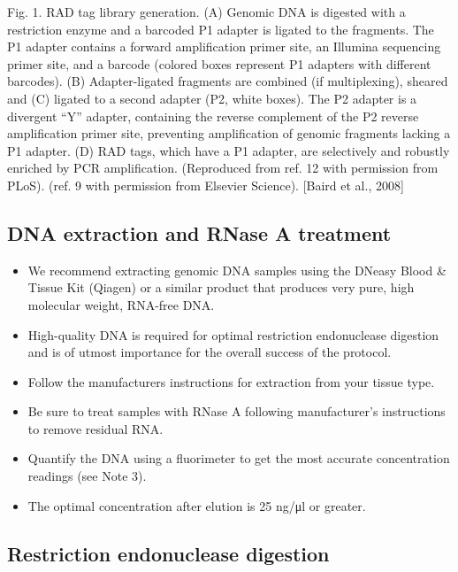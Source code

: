 \documentclass[
  letterpaper,
  DIV=11,
  numbers=noendperiod]{scrreprt}
\providecommand{\tightlist}{%
  \setlength{\itemsep}{0pt}\setlength{\parskip}{0pt}}\usepackage{longtable,booktabs,array}
\begin{document}
Fig. 1. RAD tag library generation. (A) Genomic DNA is digested with a
restriction enzyme and a barcoded P1 adapter is ligated to the
fragments. The P1 adapter contains a forward amplification primer site,
an Illumina sequencing primer site, and a barcode (colored boxes
represent P1 adapters with different barcodes). (B) Adapter-ligated
fragments are combined (if multiplexing), sheared and (C) ligated to a
second adapter (P2, white boxes). The P2 adapter is a divergent ``Y''
adapter, containing the reverse complement of the P2 reverse
amplification primer site, preventing amplification of genomic fragments
lacking a P1 adapter. (D) RAD tags, which have a P1 adapter, are
selectively and robustly enriched by PCR amplification. (Reproduced from
ref. 12 with permission from PLoS). (ref. 9 with permission from
Elsevier Science). {[}Baird et al., 2008{]}

\hypertarget{dna-extraction-and-rnase-a-treatment-1}{%
\subsection{DNA extraction and RNase A
treatment}\label{dna-extraction-and-rnase-a-treatment-1}}

\begin{itemize}
\tightlist
\item
  We recommend extracting genomic DNA samples using the DNeasy Blood \&
  Tissue Kit (Qiagen) or a similar product that produces very pure, high
  molecular weight, RNA-free DNA.
\item
  High-quality DNA is required for optimal restriction endonuclease
  digestion and is of utmost importance for the overall success of the
  protocol.
\item
  Follow the manufacturers instructions for extraction from your tissue
  type.
\item
  Be sure to treat samples with RNase A following manufacturer's
  instructions to remove residual RNA.
\item
  Quantify the DNA using a fluorimeter to get the most accurate
  concentration readings (see Note 3).
\item
  The optimal concentration after elution is 25 ng/μl or greater.
\end{itemize}

\hypertarget{restriction-endonuclease-digestion-1}{%
\subsection{Restriction endonuclease
digestion}\label{restriction-endonuclease-digestion-1}}
\end{document}
